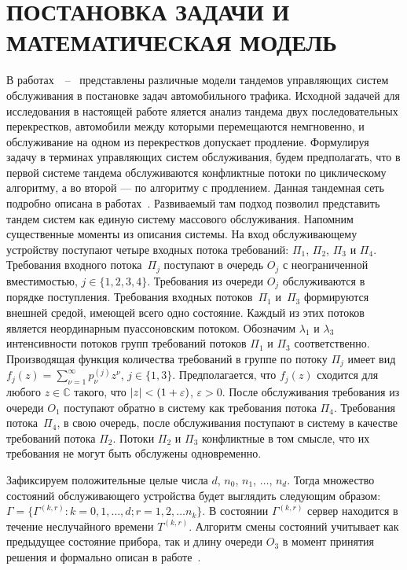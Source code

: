 \documentclass[12pt]{book}
\theoremstyle{plain}
\theoremstyle{remark}
\theoremstyle{plain}
\theoremstyle{definition}
\begin{document}


\section{ПОСТАНОВКА ЗАДАЧИ И МАТЕМАТИЧЕСКАЯ МОДЕЛЬ}\label{ProblemStatement}
В работах~\cite{Haight:1963}~--~\cite{Yamada} представлены различные модели тандемов управляющих систем обслуживания в постановке задач автомобильного трафика. Исходной задачей для исследования в настоящей работе яляется анализ тандема двух последовательных перекрестков, автомобили между которыми перемещаются немгновенно, и обслуживание на одном из перекрестков допускает продление. Формулируя задачу в терминах управляющих систем обслуживания, будем предполагать, что в  первой системе тандема обслуживаются конфликтные потоки по циклическому алгоритму, а во второй --- по алгоритму с продлением. Данная тандемная сеть
подробно описана в работах~\cite{Kocheganov:2017:1, Kocheganov:2018}. Развиваемый там подход позволил представить
тандем систем как единую систему массового обслуживания. Напомним существенные
моменты из описания системы.  На вход обслуживающему устройству поступают четыре
входных потока требований: $\Pi_1$, $\Pi_2$, $\Pi_3$ и $\Pi_4$.  Требования
входного потока~$\Pi_j$ поступают в очередь $O_j$ с неограниченной вместимостью,
$j \in \{1,2,3,4\}$. Требования из очереди $O_j$ обслуживаются в порядке
поступления. Требования входных потоков~$\Pi_1$ и~$\Pi_3$ формируются внешней
средой, имеющей всего одно состояние. Каждый из этих потоков является
неординарным пуассоновским потоком. Обозначим $\lambda_1$ и $\lambda_3$
интенсивности потоков групп требований потоков $\Pi_1$ и $\Pi_3$
соответственно. Производящая функция количества требований в группе по потоку
$\Pi_j$ имеет вид $f_j(z) = \sum_{\nu=1}^{\infty} p_{\nu}^{(j)} z ^{\nu}$, $j\in
\{1,3\}$.  Предполагается, что $f_j(z)$ сходится для любого $z\in \mathbb{C}$
такого, что $|z|<\nobreak\discretionary{}{\hbox{$\mathsurround=0pt
    <$}}{}(1+\varepsilon)$, $\varepsilon>0$. После обслуживания требования из
очереди $O_1$ поступают обратно в систему как требования потока
$\Pi_4$. Требования потока~$\Pi_4$, в свою очередь, после обслуживания поступают
в систему в качестве требований потока $\Pi_2$. Потоки $\Pi_2$ и $\Pi_3$
конфликтные в том смысле, что их требования не могут быть обслужены
одновременно. 

Зафиксируем положительные целые числа $d$, $n_0$, $n_1$, $\ldots$,
$n_d$. Тогда множество состояний обслуживающего устройства будет выглядить следующим образом: $\Gamma=\{\Gamma^{(k,r)} \colon k=0,1,\ldots,d; r=1,2,\ldots
n_k\}$. В состоянии  $\Gamma^{(k,r)}$ сервер находится в течение неслучайного
времени  $T^{(k,r)}$. Алгоритм смены состояний учитывает как предыдущее
состояние прибора, так и длину очереди $O_3$ в момент принятия решения и
формально описан в работе~\cite{Kocheganov:2017:1}. 
\end{document}
